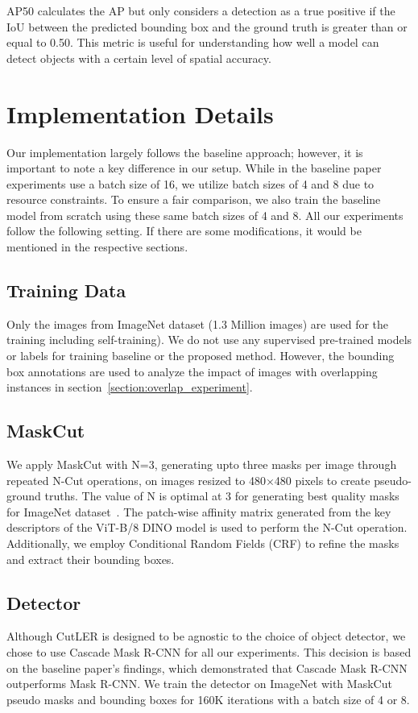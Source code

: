 AP50 calculates the AP but only considers a detection as a true positive if the IoU between the predicted bounding box and the ground truth is greater than or equal to 0.50. This metric is useful for understanding how well a model can detect objects with a certain level of spatial accuracy.

\section{Implementation Details}
\label{section:implementation_details}
Our implementation largely follows the baseline approach; however, it is important to note a key difference in our setup. While in the baseline paper experiments use a batch size of 16, we utilize batch sizes of 4 and 8 due to resource constraints. To ensure a fair comparison, we also train the baseline model from scratch using these same batch sizes of 4 and 8. All our experiments follow the following setting. If there are some modifications, it would be mentioned in the respective sections.

\subsection{Training Data}
Only the images from ImageNet dataset (1.3 Million images) are used for the training including self-training). We do not use any supervised pre-trained models or labels for training baseline or the proposed method. However, the bounding box annotations are used to analyze the impact of images with overlapping instances in section~\ref{section:overlap_experiment}.

\subsection{MaskCut}

We apply MaskCut with N=3, generating upto three masks per image through repeated N-Cut operations, on images resized to 480×480 pixels to create pseudo-ground truths. The value of N is optimal at 3 for generating best quality masks for ImageNet dataset~\cite{wang2023cut}. The patch-wise affinity matrix generated from the key descriptors of the ViT-B/8 DINO model is used to perform the N-Cut operation. Additionally, we employ Conditional Random Fields (CRF) to refine the masks and extract their bounding boxes.

\subsection{Detector}
Although CutLER is designed to be agnostic to the choice of object detector, we chose to use Cascade Mask R-CNN for all our experiments. This decision is based on the baseline paper's findings, which demonstrated that Cascade Mask R-CNN outperforms Mask R-CNN. We train the detector on ImageNet with MaskCut pseudo masks and bounding boxes for 160K iterations with a batch size of 4 or 8. 

